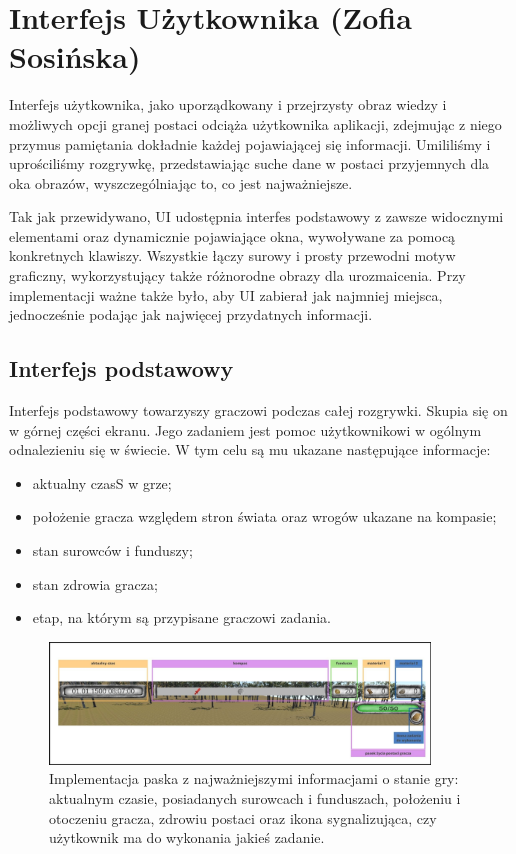 \section{Interfejs Użytkownika (Zofia Sosińska)}\label{chap:ui_imp}
Interfejs użytkownika, jako uporządkowany i przejrzysty obraz wiedzy i możliwych opcji granej postaci odciąża użytkownika
aplikacji, zdejmując z niego przymus pamiętania dokładnie każdej pojawiającej się informacji. Umililiśmy i uprościliśmy 
rozgrywkę, przedstawiając suche dane w postaci przyjemnych dla oka obrazów, wyszczególniając to, co jest najważniejsze.

Tak jak przewidywano, UI udostępnia interfes podstawowy z zawsze widocznymi elementami oraz dynamicznie pojawiające okna, wywoływane za pomocą konkretnych klawiszy.
Wszystkie łączy surowy i prosty przewodni motyw graficzny, wykorzystujący także różnorodne obrazy dla urozmaicenia. Przy implementacji ważne także było, aby UI zabierał
jak najmniej miejsca, jednocześnie podając jak najwięcej przydatnych informacji.

\subsection{Interfejs podstawowy}
Interfejs podstawowy towarzyszy graczowi podczas całej rozgrywki. Skupia się on w górnej części ekranu. Jego zadaniem jest pomoc 
użytkownikowi w ogólnym odnalezieniu się w świecie. W tym celu są mu ukazane następujące informacje:
\begin{itemize}
    \item aktualny czasS w grze;
    \item położenie gracza względem stron świata oraz wrogów ukazane na kompasie;
    \item stan surowców i funduszy;
    \item stan zdrowia gracza;
    \item etap, na którym są przypisane graczowi zadania.
\end{itemize}

\begin{figure}[htbp]
    \centering
    \includegraphics[width=0.9\textwidth]{images/ui/naszpasek.png}
    \caption{Implementacja paska z najważniejszymi informacjami o stanie gry: aktualnym czasie, posiadanych surowcach 
    i funduszach, położeniu i otoczeniu gracza, zdrowiu postaci oraz ikona sygnalizująca, czy użytkownik ma do wykonania jakieś zadanie.
    }\label{fig:naszpasek}
\end{figure}

